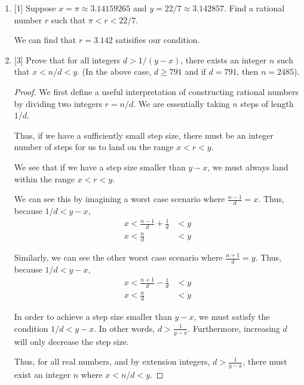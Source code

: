 \documentclass{article}
\begin{document}
\begin{enumerate}
    \item {
        [1] Suppose \(x = \pi \approx 3.14159265\) and \(y = 22/7 \approx 3.142857\).
        Find a rational number \(r\) such that \(\pi < r < 22/7\).

        We can find that \(r = 3.142\) satisifies our condition. 
    }
    \item {
        [3] Prove that for all integers \(d > 1/(y - x)\), there exists an integer 
        \(n\) such that \(x < n/d < y\). (In the above case, \(d \ge 791\) and 
        if \(d = 791\), then \(n = 2485\)).

        \begin{proof}
            We first define a useful interpretation of constructing rational 
            numbers by dividing two integers \(r = n/d\). We are essentially taking 
            \(n\) steps of length \(1/d\).

            Thus, if we have a sufficiently small step size, there must be an 
            integer number of steps for us to land on the range \(x < r < y\). 

            We see that if we have a step size smaller than \(y - x\), we must 
            always land within the range \(x < r < y\). 
            
            We can see this by imagining a worst case scenario where \(\frac{n-1}{d} = x\). 
            Thus, because \(1/d < y - x\), 
            \begin{align*}
                x < \frac{n-1}{d} + \frac{1}{d} &< y\\
                x < \frac{n}{d} &< y
            \end{align*}

            Similarly, we can see the other worst case scenario where \(\frac{n+1}{d} = y\). 
            Thus, because \(1/d < y - x\), 
            \begin{align*}
                x < \frac{n+1}{d} - \frac{1}{d} &< y\\
                x < \frac{n}{d} &< y
            \end{align*}

            In order to achieve a step size smaller than \(y - x\), we must 
            satisfy the condition \(1/d < y - x\). In other words, \(d > \frac{1}{y-x}\).
            Furthermore, increasing \(d\) will only decrease the step size. 

            Thus, for all real numbers, and by extension integers, \(d > \frac{1}{y-x}\), there must exist an 
            integer \(n\) where \(x < n/d < y\). 
        \end{proof}
    }
\end{enumerate}
\end{document}
